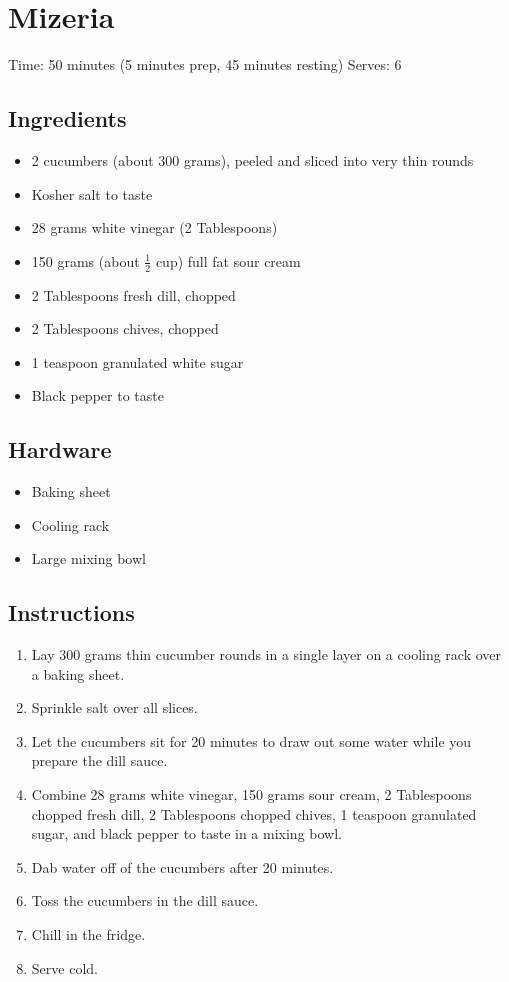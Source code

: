 \section{Mizeria}
\label{mizeria}
\setcounter{secnumdepth}{0}
Time: 50 minutes (5 minutes prep, 45 minutes resting)
Serves: 6

\begin{multicols}{2}
\subsection*{Ingredients}
\begin{itemize}
    \item 2 cucumbers (about 300 grams), peeled and sliced into very thin rounds
    \item Kosher salt to taste
    \item 28 grams white vinegar (2 Tablespoons)
    \item 150 grams (about \( \frac{1}{2} \) cup) full fat sour cream
    \item 2 Tablespoons fresh dill, chopped
    \item 2 Tablespoons chives, chopped
    \item 1 teaspoon granulated white sugar
    \item Black pepper to taste
\end{itemize}

\subsection*{Hardware}
\begin{itemize}
    \item Baking sheet
    \item Cooling rack
    \item Large mixing bowl
\end{itemize}
\clearpage

\subsection*{Instructions}
\begin{enumerate}
    \item Lay 300 grams thin cucumber rounds in a single layer on a cooling rack over a baking sheet.
    \item Sprinkle salt over all slices.
    \item Let the cucumbers sit for 20 minutes to draw out some water while you prepare the dill sauce.
    \item Combine 28 grams white vinegar, 150 grams sour cream, 2 Tablespoons chopped fresh dill, 2 Tablespoons chopped chives, 1 teaspoon granulated sugar, and black pepper to taste in a mixing bowl.
    \item Dab water off of the cucumbers after 20 minutes.
    \item Toss the cucumbers in the dill sauce.
    \item Chill in the fridge.
    \item Serve cold.


\end{enumerate}
\end{multicols}
